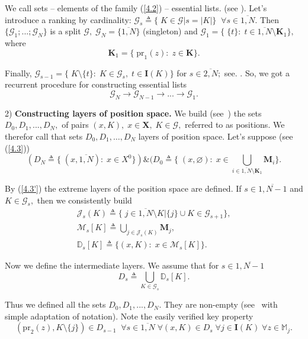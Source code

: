 \documentclass[numbers,sort&compress]{IntechOpen-Book}%
\begin{document}
We call
sets -- elements of the family  (\ref{4.2}) --
essential lists.
(see \cite[$\S 4.9$]{14}).
Let's introduce a ranking by cardinality:
$\mathcal{G}_s {\triangleq} \{\;K \in \mathcal{G} \vert s = |K|\}\;\;\forall{s} \in \overline{1,N}.$
Then
$\{\mathcal{G}_1;...;\mathcal{G}_N\}$
is a split
$\mathcal{G},\;\mathcal{G}_N = \{\overline{1,N}\}$
(singleton)
and
$\mathcal{G}_1 = \{\;\{t\}:\;t \in \overline{1,N} \setminus \mathbf{K}_1\},$
where
\begin{equation}\label{4.3}
  \mathbf{K}_1 = \{\;\mathrm{pr}_1(z):\;z \in \mathbf{K}\}.
\end{equation}

Finally,
$\mathcal{G}_{s-1} = \{\;K \setminus\{t\}:\;K \in \mathcal{G}_s,\;t \in \mathbf{I}(K)\}$
for $s \in \overline{2,N};$
see. \cite[$\S$3.5]{4}.
So, we got a recurrent procedure for constructing essential lists
$$
  \mathcal{G}_N \longrightarrow \mathcal{G}_{N-1} \longrightarrow ... \longrightarrow \mathcal{G}_1.
$$

2) {\bf Constructing layers of position space.}
We build
(see~\cite[$\S$4.9]{14})
the sets $D_0,D_1,...,D_N,$
of pairs
$(x,K),\;x \in \mathbf{X},\;K \in \mathcal{G},$
referred to as positions.
We therefor call that sets
$D_0, D_1, \dots, D_N$
layers of position space.
Let's suppose
(see  (\ref{4.3}))
\begin{equation}\label{4.3'}
  (D_N {\triangleq} \{\;(x,\overline{1,N}):\;x \in X^0\}) \&
  (D_0 {\triangleq} \{\;(x,\varnothing):\;x \in
    \bigcup\limits_{i \in \overline{1,N} \setminus \mathbf{K}_1} \mathbf{\mathbf{M}}_i\}.
\end{equation}

By
 (\ref{4.3'})
the extreme layers of the position space are defined.
If
$s \in \overline{1,N-1}$ and $K \in \mathcal{G}_s,$
then we consistently build
\begin{multline*}
  \mathcal{J}_s(K) {\triangleq}
  \{\;j \in \overline{1,N} \setminus K \vert \{j\} \cup K
  \in \mathcal{G}_{s+1}\},
  \\
  \mathcal{M}_s[K] {\triangleq}
  \bigcup\limits_{j \in \mathcal{J}_s(K)} \mathbf{M}_j,
  \\
  \mathbb{D}_s[K] {\triangleq}
  \{(x,K):\;x \in \mathcal{M}_s[K]\}.
\end{multline*}

Now we define the intermediate layers.
We assume that for
$s \in \overline{1,N - 1}$
$$
  D_s {\triangleq} \bigcup\limits_{K \in \mathcal{G}_s} \mathbb{D}_s[K].
$$

Thus we defined all the sets
$D_0,D_1,...,D_N$.
They are non-empty
(see~\cite[prop.~4.9.3]{14}
with simple adaptation of notation).
Note the easily verified key property
\begin{equation}\label{4.4}
  (\mathrm{pr}_2(z),K \setminus \{j\}) \in D_{s-1}\;\;
  \forall{s} \in \overline{1,N}\;\forall{(x,K)} \in D_s\;
  \forall{j} \in \mathbf{I}(K)\;\forall{z} \in \mathbb{M}_j.
\end{equation}
\end{document}
